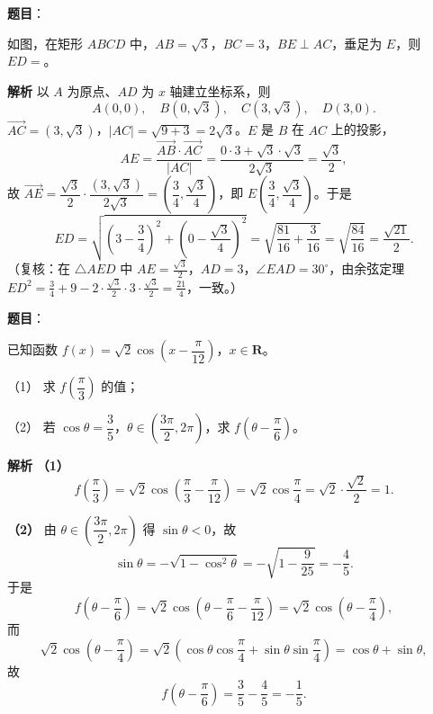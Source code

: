 \begin{answer}

\textbf{题目}：

如图，在矩形 $ABCD$ 中，$AB=\sqrt3$，$BC=3$，$BE\perp AC$，垂足为 $E$，则 $ED=$\gkblank{}。
\nopagebreak[4]
\begin{center}\end{center}
\nopagebreak[4]
\textbf{解析}
以 $A$ 为原点、$AD$ 为 $x$ 轴建立坐标系，则
\nopagebreak[4]
\[A(0,0),\quad B(0,\sqrt3),\quad C(3,\sqrt3),\quad D(3,0).\]
$\overrightarrow{AC}=(3,\sqrt3)$，$|AC|=\sqrt{9+3}=2\sqrt3$。$E$ 是 $B$ 在 $AC$ 上的投影，
\nopagebreak[4]
\[AE=\frac{\overrightarrow{AB}\cdot\overrightarrow{AC}}{|AC|}=\frac{0\cdot3+\sqrt3\cdot\sqrt3}{2\sqrt3}=\frac{\sqrt3}2,\]
故 $\overrightarrow{AE}=\dfrac{\sqrt3}{2}\cdot\dfrac{(3,\sqrt3)}{2\sqrt3}=\left(\dfrac34,\dfrac{\sqrt3}4\right)$，即 $E\left(\dfrac34,\dfrac{\sqrt3}4\right)$。于是
\nopagebreak[4]
\[ED=\sqrt{\left(3-\frac34\right)^2+\left(0-\frac{\sqrt3}4\right)^2}=\sqrt{\frac{81}{16}+\frac3{16}}=\sqrt{\frac{84}{16}}=\frac{\sqrt{21}}2.\]
（复核：在 $\triangle AED$ 中 $AE=\frac{\sqrt3}2$，$AD=3$，$\angle EAD=30^\circ$，由余弦定理 $ED^2=\frac34+9-2\cdot\frac{\sqrt3}2\cdot3\cdot\frac{\sqrt3}2=\frac{21}4$，一致。）


\end{answer}
\begin{answer}

\textbf{题目}：

已知函数 $f(x)=\sqrt2\cos\left(x-\dfrac{\pi}{12}\right)$，$x\in\mathbf R$。

（1） 求 $f\left(\dfrac{\pi}3\right)$ 的值；

（2） 若 $\cos\theta=\dfrac35$，$\theta\in\left(\dfrac{3\pi}2,2\pi\right)$，求 $f\left(\theta-\dfrac{\pi}6\right)$。

\textbf{解析}
\textbf{（1）}
\nopagebreak[4]
\[f\left(\frac\pi3\right)=\sqrt2\cos\left(\frac\pi3-\frac{\pi}{12}\right)=\sqrt2\cos\frac\pi4=\sqrt2\cdot\frac{\sqrt2}2=1.\]

\textbf{（2）} 由 $\theta\in\left(\dfrac{3\pi}2,2\pi\right)$ 得 $\sin\theta<0$，故
\nopagebreak[4]
\[\sin\theta=-\sqrt{1-\cos^2\theta}=-\sqrt{1-\frac9{25}}=-\frac45.\]
于是
\nopagebreak[4]
\[f\left(\theta-\frac\pi6\right)=\sqrt2\cos\left(\theta-\frac\pi6-\frac{\pi}{12}\right)=\sqrt2\cos\left(\theta-\frac\pi4\right),\]
而
\nopagebreak[4]
\[\sqrt2\cos\left(\theta-\frac\pi4\right)=\sqrt2\left(\cos\theta\cos\frac\pi4+\sin\theta\sin\frac\pi4\right)=\cos\theta+\sin\theta,\]
故
\nopagebreak[4]
\[f\left(\theta-\frac\pi6\right)=\frac35-\frac45=-\frac15.\]



\end{answer}
